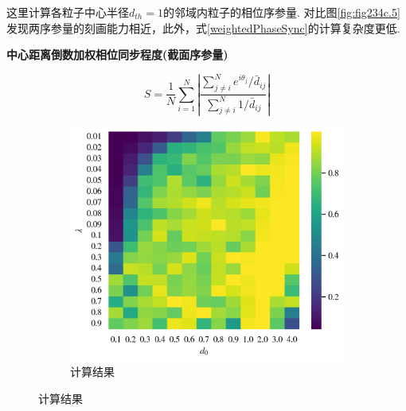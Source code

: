 \documentclass{article}
\begin{document}
\vspace{-0.5cm}
这里计算各粒子中心半径$d_{th}=1$的邻域内粒子的相位序参量.
对比图\ref{fig:fig234c.5}发现两序参量的刻画能力相近，此外，式\ref{weightedPhaseSync}的计算复杂度更低.

\noindent\textbf{中心距离倒数加权相位同步程度(截面序参量)}

\begin{equation}\label{weightedPhaseSync}
	S = \frac{1}{N}\sum_{i=1}^N{\left| \frac{\sum\nolimits_{j\ne i}^N{e^{i\theta _j}/\bar{d}_{ij}}}{\sum\nolimits_{j\ne i}^N{1/\bar{d}_{ij}}} \right|}
\end{equation}

\vspace{-0.5cm}
\begin{figure}[H]
	\centering
	\begin{subfigure}[b]{0.49\textwidth}
		\includegraphics[width=\textwidth]{./figs/weightedPhaseSync.png}
		\vspace{-1cm}
		\caption{计算结果}
		

\end{subfigure}
\end{figure}
\end{document}
